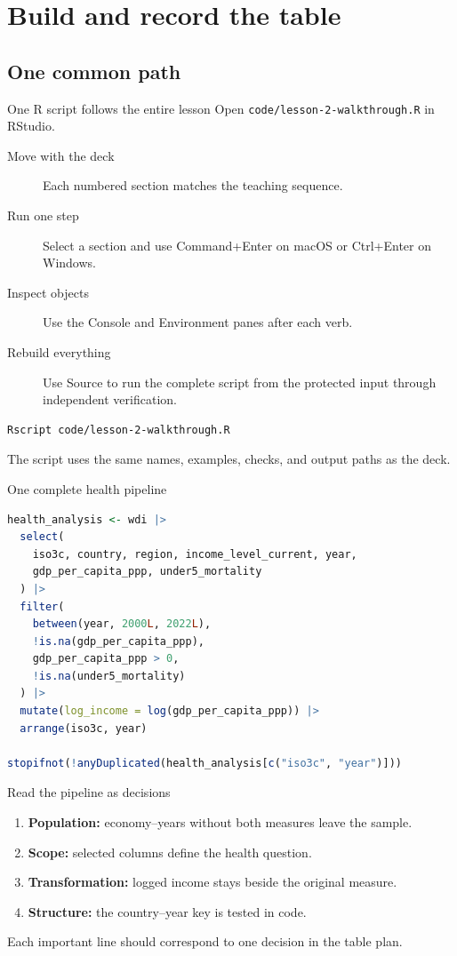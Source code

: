 \section{Build and record the table}
\subsection{One common path}

\begin{frame}[fragile]{One R script follows the entire lesson}
  Open \texttt{code/lesson-2-walkthrough.R} in RStudio.

  \begin{description}
    \item[Move with the deck] Each numbered section matches the teaching sequence.
    \item[Run one step] Select a section and use Command+Enter on macOS or
      Ctrl+Enter on Windows.
    \item[Inspect objects] Use the Console and Environment panes after each verb.
    \item[Rebuild everything] Use Source to run the complete script from the
      protected input through independent verification.
  \end{description}

\begin{lstlisting}
Rscript code/lesson-2-walkthrough.R
\end{lstlisting}

  The script uses the same names, examples, checks, and output paths as the deck.
\end{frame}

\begin{frame}[fragile]{One complete health pipeline}
\begin{lstlisting}[language=R]
health_analysis <- wdi |>
  select(
    iso3c, country, region, income_level_current, year,
    gdp_per_capita_ppp, under5_mortality
  ) |>
  filter(
    between(year, 2000L, 2022L),
    !is.na(gdp_per_capita_ppp),
    gdp_per_capita_ppp > 0,
    !is.na(under5_mortality)
  ) |>
  mutate(log_income = log(gdp_per_capita_ppp)) |>
  arrange(iso3c, year)

stopifnot(!anyDuplicated(health_analysis[c("iso3c", "year")]))
\end{lstlisting}
\end{frame}

\begin{frame}{Read the pipeline as decisions}
  \begin{enumerate}
    \item \textbf{Population:} economy--years without both measures leave the sample.
    \item \textbf{Scope:} selected columns define the health question.
    \item \textbf{Transformation:} logged income stays beside the original measure.
    \item \textbf{Structure:} the country--year key is tested in code.
  \end{enumerate}

  \vfill
  Each important line should correspond to one decision in the table plan.
\end{frame}

